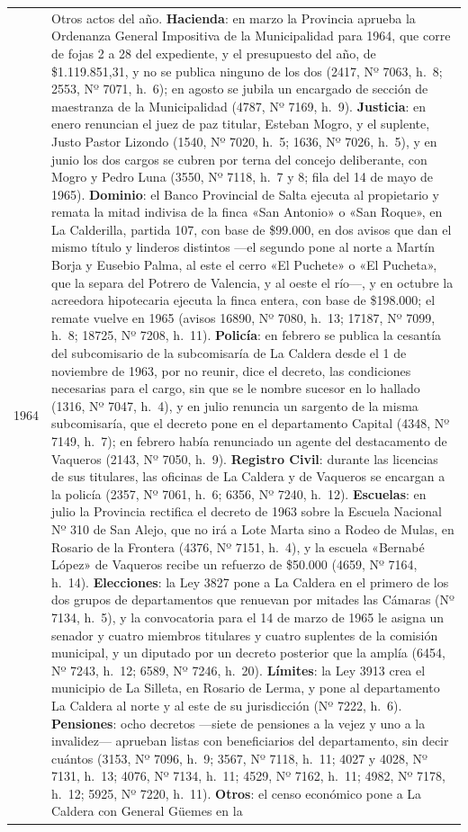 \begin{longtable}{@{}p{2.7cm}p{10.3cm}@{}}
1964 & Otros actos del año. \textbf{Hacienda}: en marzo la Provincia aprueba la Ordenanza General Impositiva de la Municipalidad para 1964, que corre de fojas 2 a 28 del expediente, y el presupuesto del año, de \$1.119.851,31, y no se publica ninguno de los dos (2417, Nº 7063, h.\ 8; 2553, Nº 7071, h.\ 6); en agosto se jubila un encargado de sección de maestranza de la Municipalidad (4787, Nº 7169, h.\ 9). \textbf{Justicia}: en enero renuncian el juez de paz titular, Esteban Mogro, y el suplente, Justo Pastor Lizondo (1540, Nº 7020, h.\ 5; 1636, Nº 7026, h.\ 5), y en junio los dos cargos se cubren por terna del concejo deliberante, con Mogro y Pedro Luna (3550, Nº 7118, h.\ 7 y 8; fila del 14 de mayo de 1965). \textbf{Dominio}: el Banco Provincial de Salta ejecuta al propietario y remata la mitad indivisa de la finca «San Antonio» o «San Roque», en La Calderilla, partida 107, con base de \$99.000, en dos avisos que dan el mismo título y linderos distintos ---el segundo pone al norte a Martín Borja y Eusebio Palma, al este el cerro «El Puchete» o «El Pucheta», que la separa del Potrero de Valencia, y al oeste el río---, y en octubre la acreedora hipotecaria ejecuta la finca entera, con base de \$198.000; el remate vuelve en 1965 (avisos 16890, Nº 7080, h.\ 13; 17187, Nº 7099, h.\ 8; 18725, Nº 7208, h.\ 11). \textbf{Policía}: en febrero se publica la cesantía del subcomisario de la subcomisaría de La Caldera desde el 1 de noviembre de 1963, por no reunir, dice el decreto, las condiciones necesarias para el cargo, sin que se le nombre sucesor en lo hallado (1316, Nº 7047, h.\ 4), y en julio renuncia un sargento de la misma subcomisaría, que el decreto pone en el departamento Capital (4348, Nº 7149, h.\ 7); en febrero había renunciado un agente del destacamento de Vaqueros (2143, Nº 7050, h.\ 9). \textbf{Registro Civil}: durante las licencias de sus titulares, las oficinas de La Caldera y de Vaqueros se encargan a la policía (2357, Nº 7061, h.\ 6; 6356, Nº 7240, h.\ 12). \textbf{Escuelas}: en julio la Provincia rectifica el decreto de 1963 sobre la Escuela Nacional Nº 310 de San Alejo, que no irá a Lote Marta sino a Rodeo de Mulas, en Rosario de la Frontera (4376, Nº 7151, h.\ 4), y la escuela «Bernabé López» de Vaqueros recibe un refuerzo de \$50.000 (4659, Nº 7164, h.\ 14). \textbf{Elecciones}: la Ley 3827 pone a La Caldera en el primero de los dos grupos de departamentos que renuevan por mitades las Cámaras (Nº 7134, h.\ 5), y la convocatoria para el 14 de marzo de 1965 le asigna un senador y cuatro miembros titulares y cuatro suplentes de la comisión municipal, y un diputado por un decreto posterior que la amplía (6454, Nº 7243, h.\ 12; 6589, Nº 7246, h.\ 20). \textbf{Límites}: la Ley 3913 crea el municipio de La Silleta, en Rosario de Lerma, y pone al departamento La Caldera al norte y al este de su jurisdicción (Nº 7222, h.\ 6). \textbf{Pensiones}: ocho decretos ---siete de pensiones a la vejez y uno a la invalidez--- aprueban listas con beneficiarios del departamento, sin decir cuántos (3153, Nº 7096, h.\ 9; 3567, Nº 7118, h.\ 11; 4027 y 4028, Nº 7131, h.\ 13; 4076, Nº 7134, h.\ 11; 4529, Nº 7162, h.\ 11; 4982, Nº 7178, h.\ 12; 5925, Nº 7220, h.\ 11). \textbf{Otros}: el censo económico pone a La Caldera con General Güemes en la 
\end{longtable}
